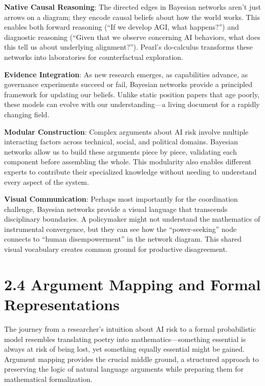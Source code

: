 \documentclass[
  11pt,
  letterpaper,
]{book}
\begin{document}
\textbf{Native Causal Reasoning}: The directed edges in Bayesian
networks aren't just arrows on a diagram; they encode causal beliefs
about how the world works. This enables both forward reasoning (``If we
develop AGI, what happens?'') and diagnostic reasoning (``Given that we
observe concerning AI behaviors, what does this tell us about underlying
alignment?''). Pearl's do-calculus \textcite{pearl2009} transforms these
networks into laboratories for counterfactual exploration.

\textbf{Evidence Integration}: As new research emerges, as capabilities
advance, as governance experiments succeed or fail, Bayesian networks
provide a principled framework for updating our beliefs. Unlike static
position papers that age poorly, these models can evolve with our
understanding---a living document for a rapidly changing field.

\textbf{Modular Construction}: Complex arguments about AI risk involve
multiple interacting factors across technical, social, and political
domains. Bayesian networks allow us to build these arguments piece by
piece, validating each component before assembling the whole. This
modularity also enables different experts to contribute their
specialized knowledge without needing to understand every aspect of the
system.

\textbf{Visual Communication}: Perhaps most importantly for the
coordination challenge, Bayesian networks provide a visual language that
transcends disciplinary boundaries. A policymaker might not understand
the mathematics of instrumental convergence, but they can see how the
``power-seeking'' node connects to ``human disempowerment'' in the
network diagram. This shared visual vocabulary creates common ground for
productive disagreement.

\section{2.4 Argument Mapping and Formal
Representations}\label{sec-argument-mapping}

The journey from a researcher's intuition about AI risk to a formal
probabilistic model resembles translating poetry into
mathematics---something essential is always at risk of being lost, yet
something equally essential might be gained. Argument mapping provides
the crucial middle ground, a structured approach to preserving the logic
of natural language arguments while preparing them for mathematical
formalization.
\end{document}
